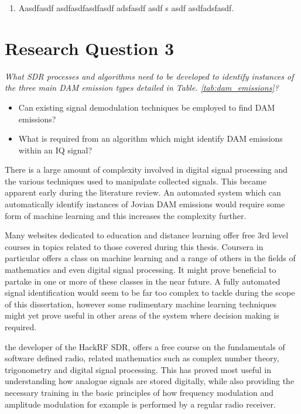 \documentclass[runningheads,a4paper]{llncs}
\begin{document}
\begin{enumerate}
	\item Aasdfasdf asdfasdfasdfasdf adsfasdf asdf s asdf  asdfadsfasdf. 
\end{enumerate}



%
%
\newpage
\chapter*{Research Question 3}

\textit{What \gls{SDR} processes and algorithms need to be developed to identify instances of the three main \gls{DAM} emission types detailed in Table. \ref{tab:dam_emissions}?}

\begin{itemize}
	\item Can existing signal demodulation techniques be employed to find \gls{DAM} emissions?
	\item What is required from an algorithm which might identify \gls{DAM} emissions within an \gls{IQ} signal?
\end{itemize}

There is a large amount of complexity involved in digital signal processing and the various techniques used to manipulate collected signals. This became apparent early during the literature review. An automated system which can automatically identify instances of Jovian \gls{DAM} emissions would require some form of machine learning and this increases the complexity further.

Many websites dedicated to education and distance learning offer free 3rd level courses in topics related to those covered during this thesis. Coursera in particular offers a class on machine learning and a range of others in the fields of mathematics and even digital signal processing. It might prove beneficial to partake in one or more of these classes in the near future. A fully automated signal identification would seem to be far too complex to tackle during the scope of this dissertation, however some rudimentary machine learning techniques might yet prove useful in other areas of the system where decision making is required.

\cite{ossmann-15-a} the developer of the HackRF \gls{SDR}, offers a free course on the fundamentals of software defined radio, related mathematics such as complex number theory, trigonometry and digital signal processing. This has proved most useful in understanding how analogue signals are stored digitally, while also providing the necessary training in the basic principles of how frequency modulation and amplitude modulation for example is performed by a regular radio receiver. 
\end{document}
